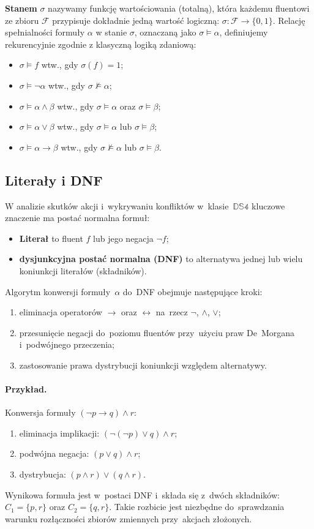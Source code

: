 \documentclass[11pt,a4paper]{article}
\theoremstyle{definition}
\begin{document}
\textbf{Stanem} $\sigma$ nazywamy funkcję wartościowania (totalną), która każdemu fluentowi ze zbioru $\mathcal{F}$ przypisuje dokładnie jedną wartość logiczną: $\sigma\colon \mathcal{F} \to \{0,1\}$.
Relację spełnialności formuły $\alpha$ w stanie $\sigma$, oznaczaną jako $\sigma \models \alpha$, definiujemy rekurencyjnie zgodnie z klasyczną logiką zdaniową:
\begin{itemize}
\item $\sigma \models f$ wtw., gdy $\sigma(f) = 1$;
\item $\sigma \models \neg\alpha$ wtw., gdy $\sigma \not\models \alpha$;
\item $\sigma \models \alpha \land \beta$ wtw., gdy $\sigma \models \alpha$ oraz $\sigma \models \beta$;
\item $\sigma \models \alpha \lor \beta$ wtw., gdy $\sigma \models \alpha$ lub $\sigma \models \beta$;
\item $\sigma \models \alpha \to \beta$ wtw., gdy $\sigma \not\models \alpha$ lub $\sigma \models \beta$.
\end{itemize}

\subsection{Literały i DNF}

W analizie skutków akcji i~wykrywaniu konfliktów w~klasie~$\mathbb{DS4}$ kluczowe znaczenie ma postać normalna formuł:
\begin{itemize}
  \item \textbf{Literał} to fluent $f$ lub jego negacja $\neg f$;
  \item \textbf{dysjunkcyjna postać normalna (DNF)} to alternatywa jednej lub wielu koniunkcji literałów (składników).
\end{itemize}
Algorytm konwersji formuły~$\alpha$ do~DNF obejmuje następujące kroki:
\begin{enumerate}
  \item eliminacja operatorów $\to$ oraz $\leftrightarrow$ na~rzecz $\neg$, $\land$, $\lor$;
  \item przesunięcie negacji do~poziomu fluentów przy~użyciu praw De~Morgana i~podwójnego przeczenia;
  \item zastosowanie prawa dystrybucji koniunkcji względem alternatywy.
\end{enumerate}

\paragraph{Przykład.} Konwersja formuły $(\neg p \to q) \land r$:
\begin{enumerate}
  \item eliminacja implikacji: $(\neg(\neg p) \lor q) \land r$;
  \item podwójna negacja: $(p \lor q) \land r$;
  \item dystrybucja: $(p \land r) \lor (q \land r)$.
\end{enumerate}
Wynikowa formuła jest w~postaci DNF i~składa się z~dwóch składników: $C_1 = \{p, r\}$ oraz $C_2 = \{q, r\}$. Takie rozbicie jest niezbędne do~sprawdzania warunku rozłączności zbiorów zmiennych przy~akcjach złożonych.
\end{document}
